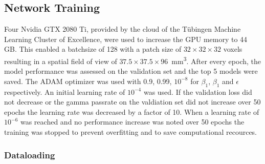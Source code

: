 \subsection{Network Training}

Four Nvidia GTX 2080 Ti, provided by the cloud of the Tübingen Machine Learning Cluster of Excellence, were used to increase the \acs{GPU} memory to 44 GB.
This enabled a batchsize of 128 with a patch size of $32 \times 32 \times 32$ voxels resulting in a spatial field of view of $37.5 \times 37.5 \times 96$~mm\textsuperscript{3}. 
After every epoch, the model performance was assessed on the validation set and the top 5 models were saved. 
The ADAM optimizer was used with 0.9, 0.99, $10^{-8}$ for $\beta_1$, $\beta_1$ and $\epsilon$ respectively. 
An initial learning rate of $10^{-4}$ was used. If the validation loss did not decrease or the gamma passrate on the valdiation set did not increase over 50 epochs the learning rate was decreased by a factor of 10. 
When a learning rate of $10^{-6}$ was reached and no performance increase was noted over 50 epochs the training was stopped to prevent overfitting and to save computational recources.
 

\subsubsection{Dataloading}

